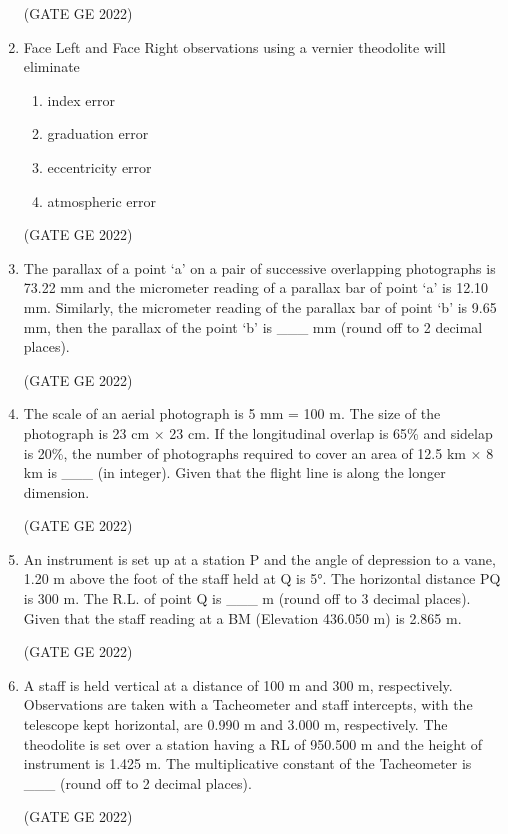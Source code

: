 \documentclass[a4paper, 11pt]{article}
\begin{document}
\begin{enumerate}
\hfill (GATE GE 2022)

\item Face Left and Face Right observations using a vernier theodolite will eliminate
\begin{enumerate}
    \item index error
    \item graduation error
    \item eccentricity error
    \item atmospheric error
\end{enumerate}

\hfill (GATE GE 2022)

\item The parallax of a point ‘a’ on a pair of successive overlapping photographs is 73.22 mm and the micrometer reading of a parallax bar of point ‘a’ is 12.10 mm. Similarly, the micrometer reading of the parallax bar of point ‘b’ is 9.65 mm, then the parallax of the point ‘b’ is \_\_\_ mm (round off to 2 decimal places).

\hfill (GATE GE 2022)

\item The scale of an aerial photograph is 5 mm = 100 m. The size of the photograph is 23 cm × 23 cm. If the longitudinal overlap is 65\% and sidelap is 20\%, the number of photographs required to cover an area of 12.5 km × 8 km is \_\_\_ (in integer). Given that the flight line is along the longer dimension.

\hfill (GATE GE 2022)

\item An instrument is set up at a station P and the angle of depression to a vane, 1.20 m above the foot of the staff held at Q is 5°. The horizontal distance PQ is 300 m. The R.L. of point Q is \_\_\_ m (round off to 3 decimal places). Given that the staff reading at a BM (Elevation 436.050 m) is 2.865 m.

\hfill (GATE GE 2022)

\item A staff is held vertical at a distance of 100 m and 300 m, respectively. Observations are taken with a Tacheometer and staff intercepts, with the telescope kept horizontal, are 0.990 m and 3.000 m, respectively. The theodolite is set over a station having a RL of 950.500 m and the height of instrument is 1.425 m. The multiplicative constant of the Tacheometer is \_\_\_ (round off to 2 decimal places).

\hfill (GATE GE 2022)


\end{enumerate}
\end{document}
